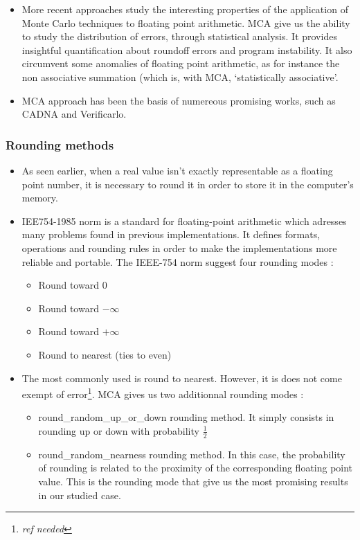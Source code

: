 \documentclass[a4paper,11pt]{article}
\let\cite=\supercite
\begin{document}
\begin{itemize}
  \item More recent approaches study the interesting properties of the application of Monte Carlo techniques to floating point arithmetic\cite{Parker1997}. MCA give us the ability to study the distribution of errors, through statistical analysis. It provides insightful quantification about roundoff errors and program instability. It also circumvent some anomalies of floating point arithmetic, as for instance the non associative summation (which is, with MCA, `statistically associative'.
  \item MCA approach has been the basis of numereous promising works, such as CADNA\cite{graillat2011stochastic} and Verificarlo\cite{denis:hal-01192668}.
\end{itemize}
\subsubsection{Rounding methods}
\begin{itemize}
  \item As seen earlier, when a real value isn't exactly representable as a floating point number, it is necessary to round it in order to store it in the computer's memory. 
  \item IEE754-1985 norm is a standard for floating-point arithmetic which adresses many problems found in previous implementations. It defines formats, operations and rounding rules in order to make the implementations more reliable and portable. The IEEE-754 norm suggest four rounding modes\cite{zuras2008ieee} :
  \begin{itemize}
    \item Round toward $0$
    \item Round toward $-\infty$
    \item Round toward $+\infty$
    \item Round to nearest (ties to even)
  \end{itemize}
  \item The most commonly used is round to nearest. However, it is does not come exempt of error\footnote{\emph{ref needed}}. MCA gives us two additionnal rounding modes : 
  \begin{itemize}
    \item {\ttfamily round\_random\_up\_or\_down} rounding method. It simply consists in rounding up or down with probability $\frac{1}{2}$
    \item {\ttfamily round\_random\_nearness} rounding method. In this case, the probability of rounding is related to the proximity of the corresponding floating point value. This is the rounding mode that give us the most promising results in our studied case. %
  \end{itemize} %
 \end{itemize}
\end{document}
